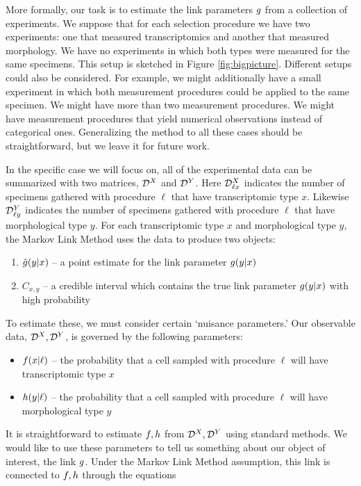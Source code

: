 More formally, our task is to estimate the link parameters $g$ from a collection of experiments.  We suppose that for each selection procedure we have two experiments: one that measured transcriptomics and another that measured morphology.  We have no experiments in which both types were measured for the same specimens.  This setup is sketched in Figure \ref{fig:bigpicture}.  Different setups could also be considered.   For example, we might additionally have a small experiment in which both measurement procedures could be applied to the same specimen.  We might have more than two measurement procedures.  We might have measurement procedures that yield numerical observations instead of categorical ones.  Generalizing the method to all these cases should be straightforward, but we leave it for future work.  

In the specific case we will focus on, all of the experimental data can be summarized with two matrices, $\mathcal{D}^X$ and $\mathcal{D}^Y$.  Here $\mathcal{D}^X_{\ell x}$ indicates the number of specimens gathered with procedure $\ell$ that have transcriptomic type $x$.  Likewise $\mathcal{D}^Y_{\ell y}$ indicates the number of specimens gathered with procedure $\ell$ that have morphological type $y$.  For each transcriptomic type $x$ and morphological type $y$, the Markov Link Method uses the data to produce two objects:
%
\begin{enumerate}
    \item $\hat {g}(y|x)$ -- a point estimate for the link parameter $g(y|x)$
    \item $C_{x,y}$ -- a credible interval which contains the true link parameter $g(y|x)$ with high probability
\end{enumerate}
%
To estimate these, we must consider certain `nuisance parameters.'  Our observable data, $\mathcal{D}^X,\mathcal{D}^Y$, is governed by the following parameters:
\begin{itemize}
    \item $f(x|\ell)$ -- the probability that a cell sampled with procedure $\ell$ will have transcriptomic type $x$
    \item $h(y|\ell)$ -- the probability that a cell sampled with procedure $\ell$ will have morphological type $y$
\end{itemize}
It is straightforward to estimate $f,h$ from $\mathcal{D}^X,\mathcal{D}^Y$ using standard methods.  We would like to use these parameters to tell us something about our object of interest, the link $g$.  Under the Markov Link Method assumption, this link is connected to $f,h$ through the equations
